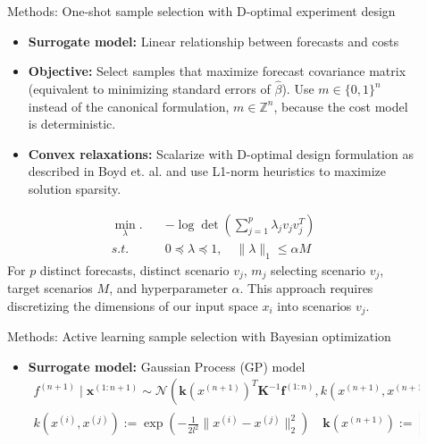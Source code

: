 \documentclass[final]{beamer}
\newlength{\sepwidth}
\newlength{\colwidth}
\newcommand{\separatorcolumn}{\begin{column}{\sepwidth}\end{column}}
\begin{document}
\begin{frame}[t]
\begin{columns}[t]
\begin{column}{\colwidth}
\end{column}

\separatorcolumn

\begin{column}{\colwidth}
  \vspace*{-10}
  \begin{block}{Methods: One-shot sample selection with D-optimal experiment design}    
    \begin{itemize}
      \item \textbf{Surrogate model:} Linear relationship between forecasts and costs
      \item \textbf{Objective:} Select samples that maximize forecast covariance matrix (equivalent to minimizing standard errors of $\hat{\beta}$). Use $m \in \{0, 1\}^n$ instead of the canonical formulation, $m \in \mathbb{Z}^n$, because the cost model is deterministic.
      \item \textbf{Convex relaxations:} Scalarize with D-optimal design formulation as described in Boyd et. al. and use L1-norm heuristics to maximize solution sparsity.
    \end{itemize}
    \begin{align*}
      \min_\lambda. \quad & -\log\det \left(\sum_{j=1}^p\lambda_jv_jv_j^T\right)\\
      s.t. \quad & 0 \preceq \lambda \preceq 1, \quad \lVert\lambda\rVert _1 \leq \alpha M
    \end{align*}
    For $p$ distinct forecasts, distinct scenario $v_j$, $m_j$ selecting scenario $v_j$, target scenarios $M$, and hyperparameter $\alpha$. This approach requires discretizing the dimensions of our input space $x_i$ into scenarios $v_j$.     

  \end{block}
  \vspace*{-10}
  \begin{block}{Methods: Active learning sample selection with Bayesian optimization}
    \begin{itemize}
      \item \textbf{Surrogate model:} Gaussian Process (GP) model
      \begin{align*}
        f^{(n+1)} \mid \textbf{x}^{(1:n+1)} \sim \mathcal{N}\left(\textbf{k}(x^{(n+1)})^T\textbf{K}^{-1}\textbf{f}^{(1:n)}, k(x^{(n+1)}, x^{(n+1)}) - \textbf{k}(x^{(n+1)})^T\textbf{K}^{-1}\textbf{k}(x^{(n+1)})\right)\\
        k(x^{(i)}, x^{(j)}) := \exp\left(-\frac{1}{2l^2}\lVert x^{(i)} - x^{(j)}\rVert^2_2\right) \quad 
        \textbf{k}(x^{(n+1)}) := \left[\dots, k(x^{(n+1)}, x^{(i)}), \dots\right] \quad
        \textbf{K}_{ij} := k(x^{(i)}, x^{(j)})
      \end{align*}


\end{itemize}
\end{block}
\end{column}
\end{columns}
\end{frame}
\end{document}
